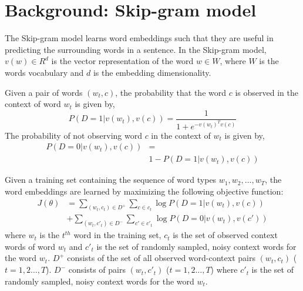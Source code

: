 \documentclass[11pt,a4paper]{article}
\begin{document}

\section{Background: Skip-gram model}
The Skip-gram model learns word embeddings such that they are useful in predicting the surrounding words in a sentence. In the Skip-gram model, $v(w) \in R^{d}$ is the vector representation
of the word $w \in W$, where $W$ is the words vocabulary and $d$ is
the embedding dimensionality.
 
Given a pair of words $(w_t,c)$, the probability that the word $c$ is
observed in the context of word $w_t$ is given by,
\begin{equation}
P(D = 1 | v(w_t), v(c)) = \frac{1}{1 + e^{-v(w_t)^Tv(c)} }
\end{equation}
The probability of not observing word $c$ in the context of $w_t$ is given by, 
\begin{align*}
P(D = 0 | v(w_t), v(c)) &= \\ & 1 - P(D = 1 | v(w_t), v(c))
\end{align*}

Given a training set containing the sequence of word types $w_1, w_2,
\ldots, w_{T}$, the word embeddings are learned by maximizing the
following objective function:
\begin{align*}
J(\theta) &= \sum_{(w_{t}, c_{t}) \in D^{+}}{ \sum_{c \in c_{t}} \log  P(D = 1 | v(w_t), v(c)) } \\
      & + \sum_{(w_{t}, c'_{t}) \in D^{-}}{ \sum_{c' \in c'_{t}} \log P(D = 0 | v(w_t), v(c'))}
\end{align*}
where $w_{t}$ is the $t^{th}$ word in the training set, $c_{t}$ is the
set of observed context words of word $w_{t}$ and $c'_{t}$ is the set
of randomly sampled, noisy context words for the word $w_{t}$. $D^{+}$
consists of the set of all observed word-context pairs $(w_{t},
c_{t})$ ($t=1,2\ldots,T$). $D^{-}$ consists of pairs $(w_{t}, c'_{t})$
($t=1,2\ldots,T$) where $c'_{t}$ is the set of randomly sampled, noisy
context words for the word $w_{t}$.
\end{document}
